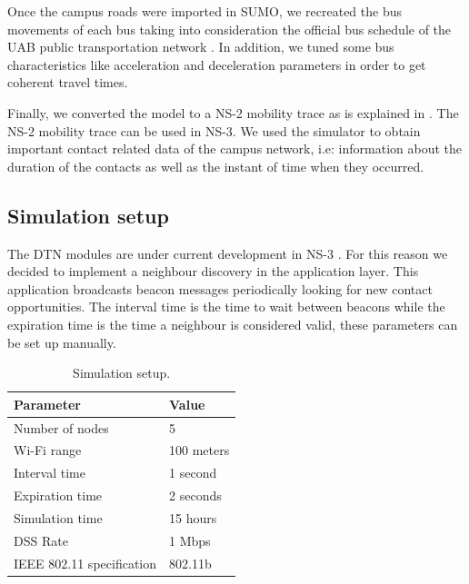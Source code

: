 Once the campus roads were imported in SUMO, we recreated the bus movements of each bus taking into consideration the official bus schedule of the UAB public transportation network \cite{bus-schedule}. In addition, we tuned some bus characteristics like acceleration and deceleration parameters in order to get coherent travel times.

Finally, we converted the model to a NS-2 mobility trace as is explained in \cite{sumo-to-ns-2}. The NS-2 mobility trace can be used in NS-3. We used the simulator to obtain important contact related data of the campus network, i.e: information about the duration of the contacts as well as the instant of time when they occurred.

\subsection{Simulation setup}


The DTN modules are under current development in NS-3 \cite{ns-3-dtn}. For this reason we decided to implement a neighbour discovery in the application layer. This application broadcasts beacon messages periodically looking for new contact opportunities. The interval time is the time to wait between beacons while the expiration time is the time a neighbour is considered valid, these parameters can be set up manually.

\begin{table}[h]
\centering
\begin{tabular}{l|l}
Parameter & Value \\
\hline
Number of nodes & 5 \\
Wi-Fi range & 100 meters \\
Interval time & 1 second \\
Expiration time & 2 seconds \\
Simulation time & 15 hours \\
DSS Rate & 1 Mbps \\
IEEE 802.11 specification & 802.11b
\end{tabular}
\caption{Simulation setup.}
\label{table:simulation-parameters}
\end{table}

